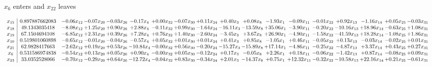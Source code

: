 \documentclass[9pt]{article}
\begin{document}
 $ x_{6} $ enters and $ x_{22} $ leaves 

 \[\begin{array}{c| c c@{\hskip 2pt} c@{\hskip 2pt} c@{\hskip 2pt} c@{\hskip 2pt} c@{\hskip 2pt} c@{\hskip 2pt} c@{\hskip 2pt} c@{\hskip 2pt} c@{\hskip 2pt} c@{\hskip 2pt} c@{\hskip 2pt} c@{\hskip 2pt} c@{\hskip 2pt} c@{\hskip 2pt} c@{\hskip 2pt} c@{\hskip 2pt} }
 x_{15}   &  0.897887662083 & -0.06 x_{12} & -0.07 x_{20} & -0.03 x_{26} & -0.17 x_{4} & +  0.00 x_{32} & -0.07 x_{30} & +  0.11 x_{24} & +  0.40 x_{3} & +  0.08 x_{8} & -1.93 x_{1} & -0.09 x_{11} & -0.01 x_{22} & +  0.92 x_{13} & -1.16 x_{14} & +  0.05 x_{25} & -0.03 x_{31}\\
 x_{18}   &  49.1343035418 & -8.08 x_{12} & +  1.25 x_{20} & +  0.90 x_{26} & +  2.88 x_{4} & -0.11 x_{32} & +  0.99 x_{30} & -1.64 x_{24} & -16.11 x_{3} & -13.59 x_{8} & + 35.06 x_{1} & -3.90 x_{11} & -0.20 x_{22} & -10.16 x_{13} & + 18.96 x_{14} & -0.63 x_{25} & +  1.08 x_{31}\\
 x_{19}   &  67.1504694108 & -6.85 x_{12} & +  2.31 x_{20} & +  0.39 x_{26} & +  7.28 x_{4} & +  0.76 x_{32} & +  1.40 x_{30} & -2.60 x_{24} & -3.45 x_{3} & +  3.67 x_{8} & + 26.90 x_{1} & -4.90 x_{11} & -1.58 x_{22} & -41.59 x_{13} & + 18.28 x_{14} & -1.08 x_{25} & +  1.86 x_{31}\\
 x_{10}   &  0.519801060898 & -0.65 x_{12} & -0.01 x_{20} & -0.04 x_{26} & -0.57 x_{4} & +  0.05 x_{32} & +  0.01 x_{30} & +  0.01 x_{24} & +  0.41 x_{3} & +  0.85 x_{8} & -1.05 x_{1} & +  0.46 x_{11} & -0.05 x_{22} & +  0.13 x_{13} & -0.03 x_{14} & -0.02 x_{25} & +  0.01 x_{31}\\
 x_{21}   &  62.9828417663 & -2.62 x_{12} & +  0.19 x_{20} & +  0.53 x_{26} & -10.84 x_{4} & -0.00 x_{32} & +  0.56 x_{30} & -0.20 x_{24} & -15.27 x_{3} & -15.89 x_{8} & + 17.14 x_{1} & -4.86 x_{11} & -0.25 x_{22} & -4.87 x_{13} & +  3.37 x_{14} & +  0.43 x_{25} & +  0.27 x_{31}\\
 x_{6}   &  0.531586974838 & -0.54 x_{12} & +  0.13 x_{20} & +  0.05 x_{26} & +  0.90 x_{4} & -0.00 x_{32} & +  0.05 x_{30} & -0.12 x_{24} & +  0.17 x_{3} & -0.05 x_{8} & +  2.26 x_{1} & +  0.18 x_{11} & -0.06 x_{22} & -1.42 x_{13} & +  0.87 x_{14} & -0.08 x_{25} & +  0.09 x_{31}\\
 x_{23}   &  33.0352528066 & -0.70 x_{12} & -0.29 x_{20} & +  0.64 x_{26} & -12.72 x_{4} & -0.04 x_{32} & +  0.83 x_{30} & -0.34 x_{24} & +  2.01 x_{3} & -14.37 x_{8} & +  0.75 x_{1} & + 12.32 x_{11} & -0.32 x_{22} & -10.58 x_{13} & + 22.16 x_{14} & +  0.21 x_{25} & -0.61 x_{31}\\

\end{array}\]
\end{document}
